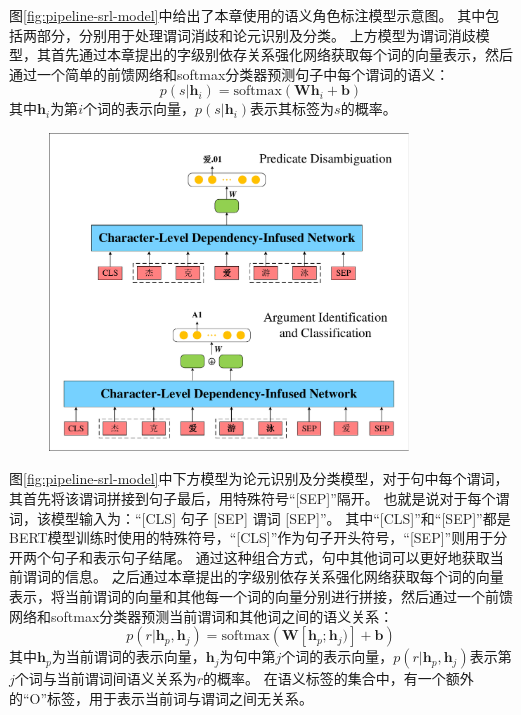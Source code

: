 图\ref{fig:pipeline-srl-model}中给出了本章使用的语义角色标注模型示意图。
其中包括两部分，分别用于处理谓词消歧和论元识别及分类。
上方模型为谓词消歧模型，其首先通过本章提出的字级别依存关系强化网络获取每个词的向量表示，然后通过一个简单的前馈网络和softmax分类器预测句子中每个谓词的语义：
\begin{equation}
    p(s|\bm{h}_i) = \text{softmax}(\bm{W}\bm{h}_i + \bm{b})
\end{equation}
其中$\bm{h}_i$为第$i$个词的表示向量，$p(s|\bm{h}_i)$表示其标签为$s$的概率。

\begin{figure}[hbtp]
	\centering
	\includegraphics[width=0.85\textwidth]{figures/pipeline-srl-model.pdf}
\end{figure}

图\ref{fig:pipeline-srl-model}中下方模型为论元识别及分类模型，对于句中每个谓词，其首先将该谓词拼接到句子最后，用特殊符号“[SEP]”隔开。
也就是说对于每个谓词，该模型输入为：“[CLS] 句子 [SEP] 谓词 [SEP]”。
其中“[CLS]”和“[SEP]”都是BERT模型训练时使用的特殊符号，“[CLS]”作为句子开头符号，“[SEP]”则用于分开两个句子和表示句子结尾。
通过这种组合方式，句中其他词可以更好地获取当前谓词的信息。
之后通过本章提出的字级别依存关系强化网络获取每个词的向量表示，将当前谓词的向量和其他每一个词的向量分别进行拼接，然后通过一个前馈网络和softmax分类器预测当前谓词和其他词之间的语义关系：
\begin{equation}
    p(r|\bm{h}_p,\bm{h}_j) = \text{softmax}(\bm{W}[\bm{h}_p;\bm{h}_j)] + \bm{b})
\end{equation}
其中$\bm{h}_p$为当前谓词的表示向量，$\bm{h}_j$为句中第$j$个词的表示向量，$p(r|\bm{h}_p,\bm{h}_j)$表示第$j$个词与当前谓词间语义关系为$r$的概率。
在语义标签的集合中，有一个额外的“O”标签，用于表示当前词与谓词之间无关系。

